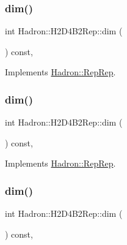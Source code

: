 \subsubsection{\texorpdfstring{dim()}{dim()}\hspace{0.1cm}{\footnotesize\ttfamily [3/5]}}
{\footnotesize\ttfamily int Hadron\+::\+H2\+D4\+B2\+Rep\+::dim (\begin{DoxyParamCaption}{ }\end{DoxyParamCaption}) const\hspace{0.3cm}{\ttfamily [inline]}, {\ttfamily [virtual]}}



Implements \mbox{\hyperlink{structHadron_1_1RepRep_a92c8802e5ed7afd7da43ccfd5b7cd92b}{Hadron\+::\+Rep\+Rep}}.

\mbox{\label{structHadron_1_1H2D4B2Rep_a90884e34cded0501eed13e3083564c1d}} 
\subsubsection{\texorpdfstring{dim()}{dim()}\hspace{0.1cm}{\footnotesize\ttfamily [4/5]}}
{\footnotesize\ttfamily int Hadron\+::\+H2\+D4\+B2\+Rep\+::dim (\begin{DoxyParamCaption}{ }\end{DoxyParamCaption}) const\hspace{0.3cm}{\ttfamily [inline]}, {\ttfamily [virtual]}}



Implements \mbox{\hyperlink{structHadron_1_1RepRep_a92c8802e5ed7afd7da43ccfd5b7cd92b}{Hadron\+::\+Rep\+Rep}}.

\mbox{\label{structHadron_1_1H2D4B2Rep_a90884e34cded0501eed13e3083564c1d}} 
\subsubsection{\texorpdfstring{dim()}{dim()}\hspace{0.1cm}{\footnotesize\ttfamily [5/5]}}
{\footnotesize\ttfamily int Hadron\+::\+H2\+D4\+B2\+Rep\+::dim (\begin{DoxyParamCaption}{ }\end{DoxyParamCaption}) const\hspace{0.3cm}{\ttfamily [inline]}, {\ttfamily [virtual]}}



